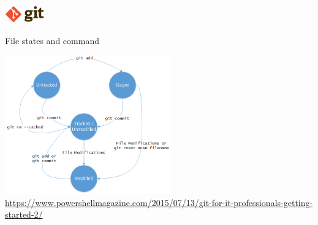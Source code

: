 \begin{frame}{\includegraphics[height=0.8cm]{shared/logo-git.png}}
\begin{block}{File states and command}
\begin{center}
   \includegraphics[height=6cm]{05_history/Images/FAIR_git_cycle.png}\\
\tiny{\url{https://www.powershellmagazine.com/2015/07/13/git-for-it-professionals-getting-started-2/}}
\end{center}
\end{block}
\end{frame}
